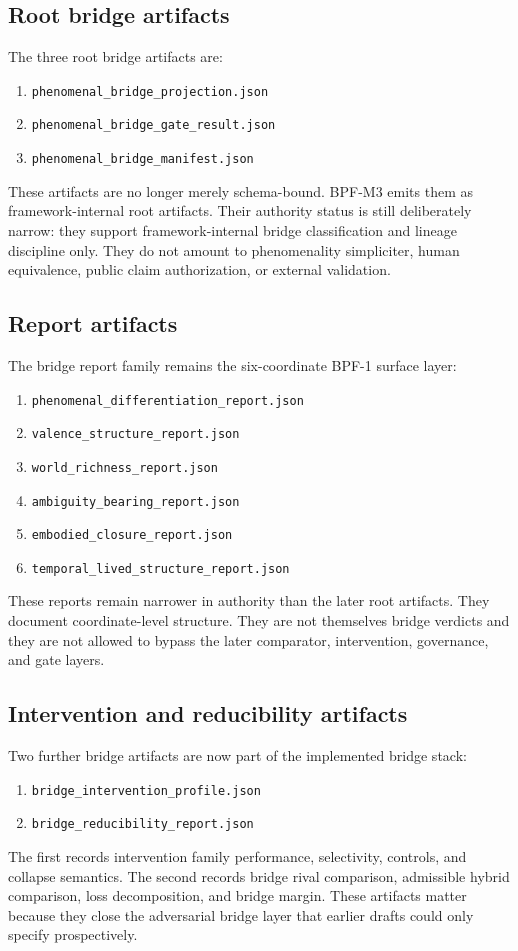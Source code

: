 \documentclass[11pt,a4paper]{article}
\theoremstyle{definition}
\begin{document}
\subsection{Root bridge artifacts}
The three root bridge artifacts are:
\begin{enumerate}[leftmargin=1.5em]
\item \texttt{phenomenal\_bridge\_projection.json}
\item \texttt{phenomenal\_bridge\_gate\_result.json}
\item \texttt{phenomenal\_bridge\_manifest.json}
\end{enumerate}
These artifacts are no longer merely schema-bound. BPF-M3 emits them as framework-internal root artifacts. Their authority status is still deliberately narrow: they support framework-internal bridge classification and lineage discipline only. They do not amount to phenomenality simpliciter, human equivalence, public claim authorization, or external validation.

\subsection{Report artifacts}
The bridge report family remains the six-coordinate BPF-1 surface layer:
\begin{enumerate}[leftmargin=1.5em]
\item \texttt{phenomenal\_differentiation\_report.json}
\item \texttt{valence\_structure\_report.json}
\item \texttt{world\_richness\_report.json}
\item \texttt{ambiguity\_bearing\_report.json}
\item \texttt{embodied\_closure\_report.json}
\item \texttt{temporal\_lived\_structure\_report.json}
\end{enumerate}
These reports remain narrower in authority than the later root artifacts. They document coordinate-level structure. They are not themselves bridge verdicts and they are not allowed to bypass the later comparator, intervention, governance, and gate layers.

\subsection{Intervention and reducibility artifacts}
Two further bridge artifacts are now part of the implemented bridge stack:
\begin{enumerate}[leftmargin=1.5em]
\item \texttt{bridge\_intervention\_profile.json}
\item \texttt{bridge\_reducibility\_report.json}
\end{enumerate}
The first records intervention family performance, selectivity, controls, and collapse semantics. The second records bridge rival comparison, admissible hybrid comparison, loss decomposition, and bridge margin. These artifacts matter because they close the adversarial bridge layer that earlier drafts could only specify prospectively.
\end{document}
